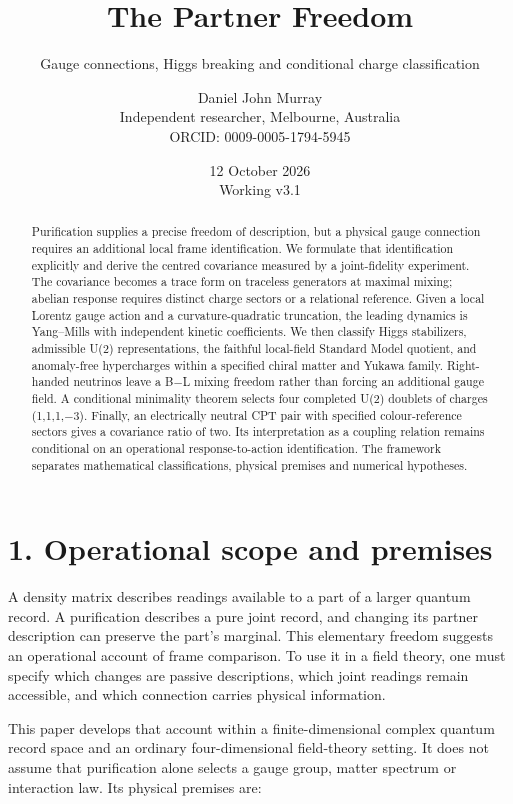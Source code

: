 \documentclass[
  11pt,
  a4paper,
]{article}
\title{The Partner Freedom}
\subtitle{Gauge connections, Higgs breaking and conditional charge classification}
\author{Daniel John Murray\\{\small Independent researcher, Melbourne, Australia}\\{\small ORCID: 0009-0005-1794-5945}}
\date{12 October 2026\\{\small Working v3.1}}
\begin{document}
\maketitle
\begin{abstract}
Purification supplies a precise freedom of description, but a physical gauge connection requires an additional local frame identification. We formulate that identification explicitly and derive the centred covariance measured by a joint-fidelity experiment. The covariance becomes a trace form on traceless generators at maximal mixing; abelian response requires distinct charge sectors or a relational reference. Given a local Lorentz gauge action and a curvature-quadratic truncation, the leading dynamics is Yang--Mills with independent kinetic coefficients. We then classify Higgs stabilizers, admissible U(2) representations, the faithful local-field Standard Model quotient, and anomaly-free hypercharges within a specified chiral matter and Yukawa family. Right-handed neutrinos leave a B−L mixing freedom rather than forcing an additional gauge field. A conditional minimality theorem selects four completed U(2) doublets of charges (1,1,1,−3). Finally, an electrically neutral CPT pair with specified colour-reference sectors gives a covariance ratio of two. Its interpretation as a coupling relation remains conditional on an operational response-to-action identification. The framework separates mathematical classifications, physical premises and numerical hypotheses.
\end{abstract}

\section{1. Operational scope and premises}\label{operational-scope-and-premises}

A density matrix describes readings available to a part of a larger quantum record. A purification describes a pure joint record, and changing its partner description can preserve the part's marginal. This elementary freedom suggests an operational account of frame comparison. To use it in a field theory, one must specify which changes are passive descriptions, which joint readings remain accessible, and which connection carries physical information.

This paper develops that account within a finite-dimensional complex quantum record space and an ordinary four-dimensional field-theory setting. It does not assume that purification alone selects a gauge group, matter spectrum or interaction law. Its physical premises are:
\end{document}
